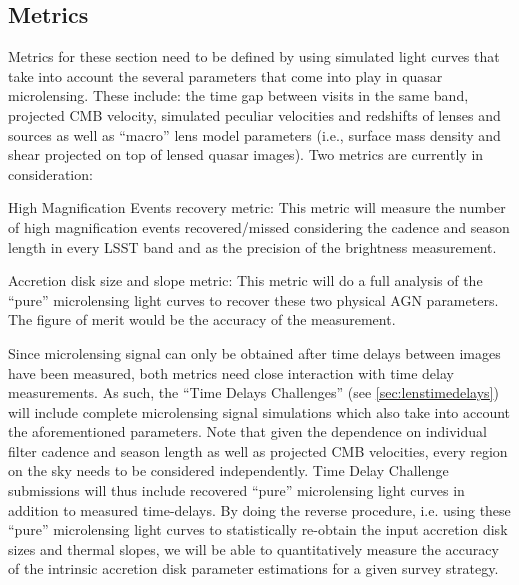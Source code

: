 
\subsection{Metrics}
\label{sec:\secname:metrics}

Metrics for these section need to be defined by using simulated light curves
that take into account the several parameters that come into play in quasar
microlensing. These include: the time gap between visits in the same band,
projected CMB velocity, simulated peculiar velocities and redshifts of lenses
and sources as well as ``macro'' lens model parameters (i.e., surface mass
density and shear projected on top of lensed quasar images). Two metrics are
currently in consideration:

High Magnification Events recovery metric: This metric will measure the
number of high magnification events recovered/missed considering the
cadence and season length in every LSST band and as the precision of the
brightness measurement.



Accretion disk size and slope metric: This metric will do a full
analysis of the ``pure'' microlensing light curves to recover these two
physical AGN parameters. The figure of merit would be the accuracy of
the measurement.

Since microlensing signal can only be obtained after time delays between images
have been measured, both metrics need close interaction with time delay
measurements. As such, the ``Time Delays Challenges'' (see
\autoref{sec:lenstimedelays}) will include complete microlensing signal
simulations which also take into account the aforementioned parameters. Note
that given
the dependence on individual filter cadence and season length as well as
projected CMB velocities, every region on the sky needs to be considered
independently. Time Delay Challenge submissions will thus include recovered
``pure'' microlensing
light curves in addition to measured time-delays. By doing the reverse
procedure, i.e. using these ``pure'' microlensing light curves to statistically
re-obtain the input accretion disk sizes and thermal slopes, we will be able to
quantitatively measure the accuracy of the intrinsic accretion disk parameter
estimations for a given survey strategy.




